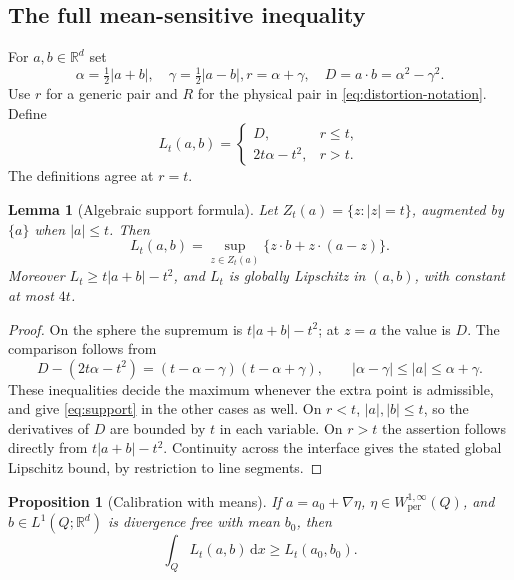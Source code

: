 \documentclass[11pt,a4paper]{article}
\numberwithin{equation}{section}
\newtheorem{lemma}[theorem]{Lemma}
\newtheorem{proposition}[theorem]{Proposition}
\theoremstyle{definition}
\theoremstyle{remark}\newtheorem{remark}[theorem]{Remark}
\newcommand{\R}{\mathbb R}
\newcommand{\dd}{\,\mathrm dx}
\newcommand{\per}{\mathrm{per}}
\begin{document}
\subsection{The full mean-sensitive inequality}

For \(a,b\in\R^d\) set
\[
 \alpha=\tfrac12|a+b|,\quad \gamma=\tfrac12|a-b|,
 r=\alpha+\gamma,\quad D=a\cdot b=\alpha^2-\gamma^2.
\]
Use \(r\) for a generic pair and \(R\) for the physical pair in
\eqref{eq:distortion-notation}. Define
\begin{equation}\label{eq:calibration}
 L_t(a,b)=
 \begin{cases}
 D,&r\leq t,\\
 2t\alpha-t^2,&r>t.
 \end{cases}
\end{equation}
The definitions agree at \(r=t\).

\begin{lemma}[Algebraic support formula]\label{lem:support}
Let \(Z_t(a)=\{z:|z|=t\}\), augmented by \(\{a\}\) when \(|a|\leq t\).
Then
\begin{equation}\label{eq:support}
 L_t(a,b)=\sup_{z\in Z_t(a)}
              \{z\cdot b+z\cdot(a-z)\}.
\end{equation}
Moreover \(L_t\geq t|a+b|-t^2\), and \(L_t\) is globally Lipschitz
in \((a,b)\), with constant at most \(4t\).
\end{lemma}

\begin{proof}
On the sphere the supremum is \(t|a+b|-t^2\); at \(z=a\) the value is
\(D\). The comparison follows from
\[
 D-(2t\alpha-t^2)=(t-\alpha-\gamma)(t-\alpha+\gamma),
 \qquad |\alpha-\gamma|\leq|a|\leq\alpha+\gamma.
\]
These inequalities decide the maximum whenever the extra point is
admissible, and give \eqref{eq:support} in the other cases as well.
On \(r<t\), \(|a|,|b|\leq t\), so the derivatives of \(D\) are bounded
by \(t\) in each variable. On \(r>t\) the assertion follows directly
from \(t|a+b|-t^2\). Continuity across the interface gives the stated
global Lipschitz bound, by restriction to line segments.
\end{proof}

\begin{proposition}[Calibration with means]\label{prop:calibration}
If \(a=a_0+\nabla\eta\), \(\eta\in W^{1,\infty}_{\per}(Q)\), and
\(b\in L^1(Q;\R^d)\) is divergence free with mean \(b_0\), then
\begin{equation}\label{eq:mean-calibration}
 \int_QL_t(a,b)\dd\geq L_t(a_0,b_0).
\end{equation}
\end{proposition}
\end{document}
